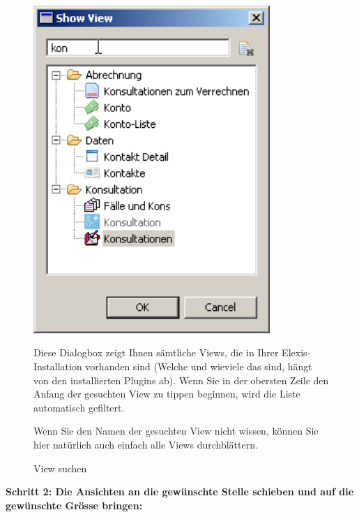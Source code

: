 \begin{figure}[htbp]
   \begin{minipage}{0.4\textwidth}
       \centering
       \includegraphics[width=0.8\textwidth]{images/customize1}
       \caption{View suchen}
       \label{fig:cust1}
     \end{minipage}\hfill
     \begin{minipage}{0.5\textwidth}
        Diese Dialogbox zeigt Ihnen sämtliche Views, die in Ihrer Elexis-Installation vorhanden sind (Welche und wieviele das sind, hängt von den installierten Plugins ab). Wenn Sie in der obersten Zeile den Anfang der gesuchten View zu tippen beginnen, wird die Liste automatisch gefiltert.
        
        Wenn Sie den Namen der gesuchten View nicht wissen, können Sie hier natürlich auch einfach alle Views durchblättern.
    \end{minipage}
\end{figure}

\bigskip
\pagebreak[3]
\textbf{Schritt 2: Die Ansichten an die gewünschte Stelle schieben und auf die gewünschte Grösse bringen:}\\

